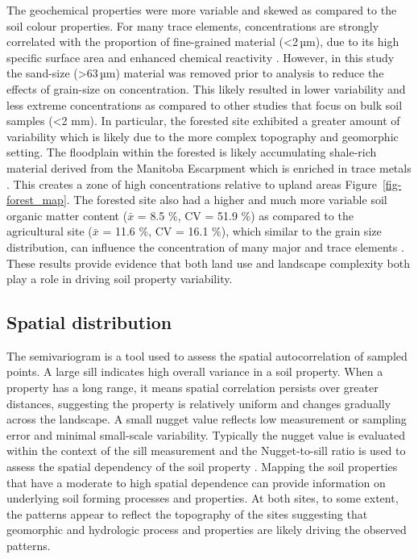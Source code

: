 \documentclass[
  number]{elsarticle}
\begin{document}
The geochemical properties were more variable and skewed as compared to
the soil colour properties. For many trace elements, concentrations are
strongly correlated with the proportion of fine-grained material
(\textless2\,µm), due to its high specific surface area and enhanced
chemical reactivity \citep{horowitz1991}. However, in this study the
sand-size (\textgreater63\,µm) material was removed prior to analysis to
reduce the effects of grain-size on concentration. This likely resulted
in lower variability and less extreme concentrations as compared to
other studies that focus on bulk soil samples (\textless2 mm). In
particular, the forested site exhibited a greater amount of variability
which is likely due to the more complex topography and geomorphic
setting. The floodplain within the forested is likely accumulating
shale-rich material derived from the Manitoba Escarpment which is
enriched in trace metals \citep{nicolas2011}. This creates a zone of
high concentrations relative to upland areas
Figure~\ref{fig-forest_map}. The forested site also had a higher and
much more variable soil organic matter content (\(\bar{x}\) = 8.5 \%, CV
= 51.9 \%) as compared to the agricultural site (\(\bar{x}\) = 11.6 \%,
CV = 16.1 \%), which similar to the grain size distribution, can
influence the concentration of many major and trace elements
\citep{horowitz1991}. These results provide evidence that both land use
and landscape complexity both play a role in driving soil property
variability.

\subsection{Spatial distribution}\label{spatial-distribution}

The semivariogram is a tool used to assess the spatial autocorrelation
of sampled points. A large sill indicates high overall variance in a
soil property. When a property has a long range, it means spatial
correlation persists over greater distances, suggesting the property is
relatively uniform and changes gradually across the landscape. A small
nugget value reflects low measurement or sampling error and minimal
small-scale variability. Typically the nugget value is evaluated within
the context of the sill measurement and the Nugget-to-sill ratio is used
to assess the spatial dependency of the soil property
\citep{cambardella1994}. Mapping the soil properties that have a
moderate to high spatial dependence can provide information on
underlying soil forming processes and properties. At both sites, to some
extent, the patterns appear to reflect the topography of the sites
suggesting that geomorphic and hydrologic process and properties are
likely driving the observed patterns.
\end{document}
